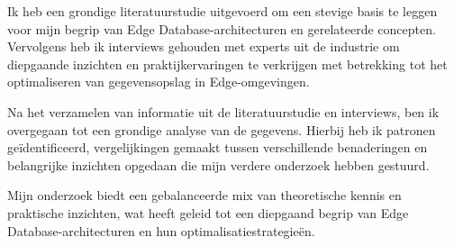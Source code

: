 Ik heb een grondige literatuurstudie uitgevoerd om een stevige basis te leggen voor mijn begrip van Edge Database-architecturen en gerelateerde concepten. Vervolgens heb ik interviews gehouden met experts uit de industrie om diepgaande inzichten en praktijkervaringen te verkrijgen met betrekking tot het optimaliseren van gegevensopslag in Edge-omgevingen.

Na het verzamelen van informatie uit de literatuurstudie en interviews, ben ik overgegaan tot een grondige analyse van de gegevens. Hierbij heb ik patronen geïdentificeerd, vergelijkingen gemaakt tussen verschillende benaderingen en belangrijke inzichten opgedaan die mijn verdere onderzoek hebben gestuurd.

Mijn onderzoek biedt een gebalanceerde mix van theoretische kennis en praktische inzichten, wat heeft geleid tot een diepgaand begrip van Edge Database-architecturen en hun optimalisatiestrategieën.
